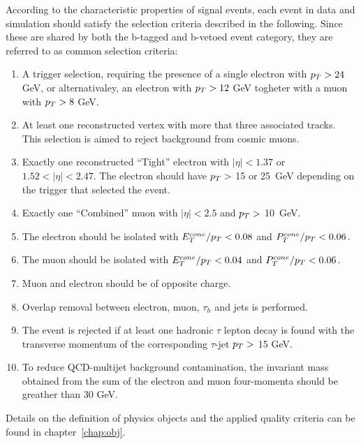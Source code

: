 According to the characteristic properties of signal events, each event in data and simulation should satisfy
the selection criteria described in the following. Since these are shared by both the b-tagged and b-vetoed event category,
they are referred to as common selection criteria:


\begin{enumerate}[label=(\roman*)]
\item A trigger selection, requiring the presence of a single electron with $p_{T} > 24$ GeV, or alternativaley,
	an electron with  $p_{T} > 12$ GeV togheter with a muon with  $p_{T} > 8$ GeV. 

\item At least one reconstructed vertex with more that three associated tracks. This selection is aimed to 
	reject background from cosmic muons.

\item Exactly one reconstructed ``Tight'' electron with $|\eta| < 1.37 $ or $1.52 < |\eta| < 2.47$.
	The electron  should have $p_{T} > $ 15 or 25~GeV depending on the trigger that selected the event. 

\item Exactly one ``Combined'' muon with $|\eta| < 2.5$ and  $p_{T} > $ 10~GeV.

\item The electron should be isolated with $E_T^{cone}/ p_{T} < 0.08$ and $P_T^{cone}/ p_{T} < 0.06\,.$ 

\item The muon should be isolated with  $E_T^{cone}/ p_{T} < 0.04$ and $P_T^{cone}/ p_{T} <  0.06\,.$ 

\item Muon and electron should be of opposite charge.

\item Overlap removal between electron, muon, $\tau_h$ and jets is performed.

\item The event is rejected if at least one hadronic $\tau$ lepton decay is found with the transverse 
	momentum of the corresponding $\tau$-jet  $p_{T} > $ 15 GeV.

\item To reduce QCD-multijet background contamination, the invariant mass obtained from the sum 
	of the electron and muon four-momenta should be greather than 30 GeV.

\end{enumerate}
Details on  the definition of physics objects and the applied quality criteria  can be found in  chapter~\ref{chap:obj}.

